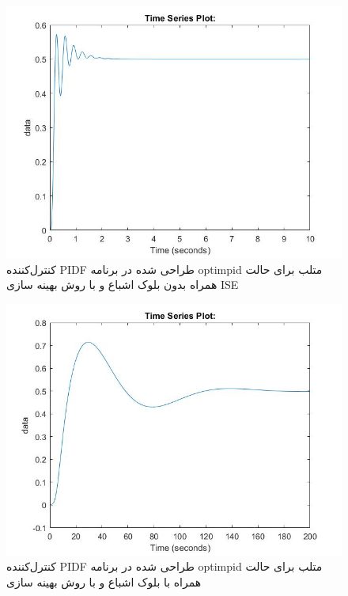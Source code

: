 \begin{figure}[H]
	\centering
	\includegraphics[width=12cm]{../Figure/P_IV/PID_ISE_without_sat.jpg}
	\caption{کنترل‌کننده PIDF طراحی شده در برنامه optimpid متلب برای حالت همراه بدون بلوک اشباع و با روش بهینه سازی ISE}
\end{figure}

\begin{figure}[H]
	\centering
	\includegraphics[width=12cm]{../Figure/P_IV/PID_IT2AE_with_sat.jpg}
	\caption{کنترل‌کننده PIDF طراحی شده در برنامه optimpid متلب برای حالت همراه با بلوک اشباع و با روش بهینه سازی }
\end{figure}

%

